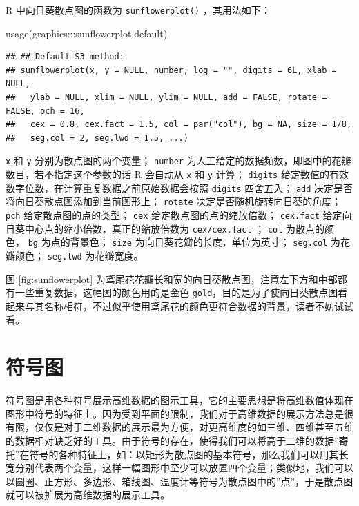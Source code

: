 \documentclass[
  b5paper,
  UTF8,twoside]{book}
\newenvironment{Shaded}{\begin{snugshade}}{\end{snugshade}}
\newcommand{\FunctionTok}[1]{\textcolor[rgb]{0.00,0.00,0.00}{#1}}
\newcommand{\NormalTok}[1]{#1}
\newcommand{\SpecialCharTok}[1]{\textcolor[rgb]{0.00,0.00,0.00}{#1}}
\begin{document}
R 中向日葵散点图的函数为 \texttt{sunflowerplot()} ，其用法如下：

\begin{Shaded}
\begin{Highlighting}[]
\FunctionTok{usage}\NormalTok{(graphics}\SpecialCharTok{:::}\NormalTok{sunflowerplot.default)}
\end{Highlighting}
\end{Shaded}

\begin{verbatim}
## ## Default S3 method:
## sunflowerplot(x, y = NULL, number, log = "", digits = 6L, xlab = NULL,
##   ylab = NULL, xlim = NULL, ylim = NULL, add = FALSE, rotate = FALSE, pch = 16,
##   cex = 0.8, cex.fact = 1.5, col = par("col"), bg = NA, size = 1/8,
##   seg.col = 2, seg.lwd = 1.5, ...)
\end{verbatim}

\texttt{x} 和 \texttt{y} 分别为散点图的两个变量； \texttt{number} 为人工给定的数据频数，即图中的花瓣数目，若不指定这个参数的话 R 会自动从 \texttt{x} 和 \texttt{y} 计算； \texttt{digits} 给定数值的有效数字位数，在计算重复数据之前原始数据会按照 \texttt{digits} 四舍五入； \texttt{add} 决定是否将向日葵散点图添加到当前图形上； \texttt{rotate} 决定是否随机旋转向日葵的角度； \texttt{pch} 给定散点图的点的类型； \texttt{cex} 给定散点图的点的缩放倍数； \texttt{cex.fact} 给定向日葵中心点的缩小倍数，真正的缩放倍数为 \texttt{cex/cex.fact} ； \texttt{col} 为散点的颜色， \texttt{bg} 为点的背景色； \texttt{size} 为向日葵花瓣的长度，单位为英寸； \texttt{seg.col} 为花瓣颜色； \texttt{seg.lwd} 为花瓣宽度。

图 \ref{fig:sunflowerplot} 为鸢尾花花瓣长和宽的向日葵散点图，注意左下方和中部都有一些重复数据，这幅图的颜色用的是金色 \texttt{\textquotesingle{}gold\textquotesingle{}}，目的是为了使向日葵散点图看起来与其名称相符，不过似乎使用鸢尾花的颜色更符合数据的背景，读者不妨试试看。

\hypertarget{sec:symbols}{%
\section{符号图}\label{sec:symbols}}

符号图是用各种符号展示高维数据的图示工具，它的主要思想是将高维数值体现在图形中符号的特征上。因为受到平面的限制，我们对于高维数据的展示方法总是很有限，仅仅是对于二维数据的展示最为方便，对更高维度的如三维、四维甚至五维的数据相对缺乏好的工具。由于符号的存在，使得我们可以将高于二维的数据''寄托''在符号的各种特征上，如：以矩形为散点图的基本符号，那么我们可以用其长宽分别代表两个变量，这样一幅图形中至少可以放置四个变量；类似地，我们可以以圆圈、正方形、多边形、箱线图、温度计等符号为散点图中的''点''，于是散点图就可以被扩展为高维数据的展示工具。
\end{document}
